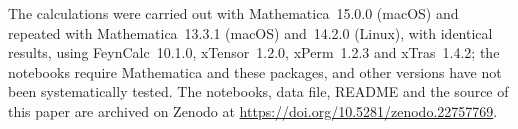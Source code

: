 \documentclass[prd,aps,preprint,nofootinbib,amsmath,amssymb,eqsecnum]{revtex4-2}
\begin{document}
The calculations were carried out with Mathematica~15.0.0 (macOS) and repeated with
Mathematica~13.3.1 (macOS) and~14.2.0 (Linux), with identical results, using FeynCalc~10.1.0,
xTensor~1.2.0, xPerm~1.2.3 and xTras~1.4.2; the notebooks require Mathematica and these
packages, and other versions have not been systematically tested. The notebooks, data file, README and the source
of this paper are archived on Zenodo at \url{https://doi.org/10.5281/zenodo.22757769}.




\end{document}
